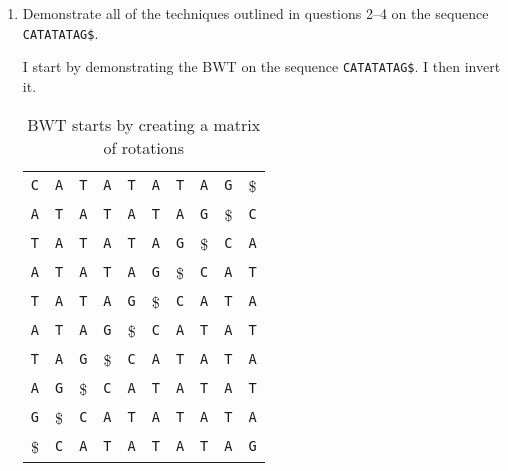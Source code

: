\documentclass[10pt,\jkfside,a4paper]{article}
\begin{document}
\begin{enumerate}
\begin{itemize}
    \end{itemize}

    \item Demonstrate all of the techniques outlined in questions 2--4 on the sequence \texttt{CATATATAG\$}.

    I start by demonstrating the BWT on the sequence \texttt{CATATATAG\$}. I then invert it.

    \begin{table}[H]

        \centering

        \begin{tabular}{cccccccccc}
            \texttt C & \texttt A & \texttt T & \texttt A & \texttt T & \texttt A & \texttt T & \texttt A & \texttt G & \$ \\
            \texttt A & \texttt T & \texttt A & \texttt T & \texttt A & \texttt T & \texttt A & \texttt G & \$ & \texttt C \\
            \texttt T & \texttt A & \texttt T & \texttt A & \texttt T & \texttt A & \texttt G & \$ & \texttt C & \texttt A \\
            \texttt A & \texttt T & \texttt A & \texttt T & \texttt A & \texttt G & \$ & \texttt C & \texttt A & \texttt T \\
            \texttt T & \texttt A & \texttt T & \texttt A & \texttt G & \$ & \texttt C & \texttt A & \texttt T & \texttt A \\
            \texttt A & \texttt T & \texttt A & \texttt G & \$ & \texttt C & \texttt A & \texttt T & \texttt A & \texttt T \\
            \texttt T & \texttt A & \texttt G & \$ & \texttt C & \texttt A & \texttt T & \texttt A & \texttt T & \texttt A \\
            \texttt A & \texttt G & \$ & \texttt C & \texttt A & \texttt T & \texttt A & \texttt T & \texttt A & \texttt T \\
            \texttt G & \$ & \texttt C & \texttt A & \texttt T & \texttt A & \texttt T & \texttt A & \texttt T & \texttt A \\
            \$ & \texttt C & \texttt A & \texttt T & \texttt A & \texttt T & \texttt A & \texttt T & \texttt A & \texttt G
        \end{tabular}

        \caption{BWT starts by creating a matrix of rotations}

    \end{table}

    \begin{table}[H]


\end{table}
\end{enumerate}
\end{document}
